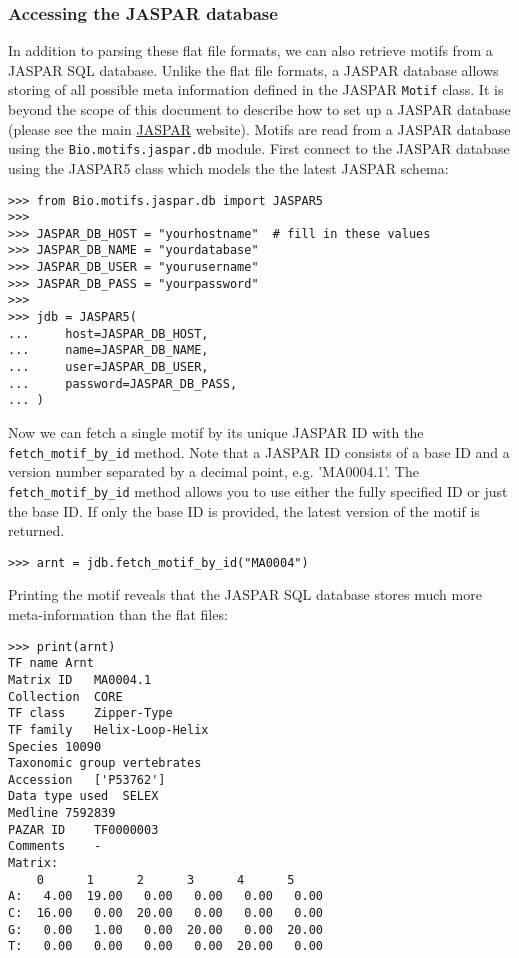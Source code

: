 \subsubsection*{Accessing the JASPAR database}

In addition to parsing these flat file formats, we can also retrieve motifs from a JASPAR SQL database. Unlike the flat file formats, a JASPAR database allows storing of all possible meta information defined in the JASPAR \verb+Motif+ class. It is beyond the scope of this document to describe how to set up a JASPAR database (please see the main \href{http://jaspar.genereg.net}{JASPAR} website). Motifs are read from a JASPAR database using the \verb+Bio.motifs.jaspar.db+ module.  First connect to the JASPAR database using the JASPAR5 class which models the the latest JASPAR schema:
\begin{verbatim}
>>> from Bio.motifs.jaspar.db import JASPAR5
>>>
>>> JASPAR_DB_HOST = "yourhostname"  # fill in these values
>>> JASPAR_DB_NAME = "yourdatabase"
>>> JASPAR_DB_USER = "yourusername"
>>> JASPAR_DB_PASS = "yourpassword"
>>>
>>> jdb = JASPAR5(
...     host=JASPAR_DB_HOST,
...     name=JASPAR_DB_NAME,
...     user=JASPAR_DB_USER,
...     password=JASPAR_DB_PASS,
... )
\end{verbatim}

Now we can fetch a single motif by its unique JASPAR ID with the \verb+fetch_motif_by_id+ method. Note that a JASPAR ID consists of a base ID and a version number separated by a decimal point, e.g. 'MA0004.1'. The \verb+fetch_motif_by_id+ method allows you to use either the fully specified ID or just the base ID. If only the base ID is provided, the latest version of the motif is returned.
\begin{verbatim}
>>> arnt = jdb.fetch_motif_by_id("MA0004")
\end{verbatim}
Printing the motif reveals that the JASPAR SQL database stores much more meta-information than the flat files:
\begin{verbatim}
>>> print(arnt)
TF name	Arnt
Matrix ID	MA0004.1
Collection	CORE
TF class	Zipper-Type
TF family	Helix-Loop-Helix
Species	10090
Taxonomic group	vertebrates
Accession	['P53762']
Data type used	SELEX
Medline	7592839
PAZAR ID	TF0000003
Comments	-
Matrix:
	0      1      2      3      4      5
A:   4.00  19.00   0.00   0.00   0.00   0.00
C:  16.00   0.00  20.00   0.00   0.00   0.00
G:   0.00   1.00   0.00  20.00   0.00  20.00
T:   0.00   0.00   0.00   0.00  20.00   0.00


\end{verbatim}

